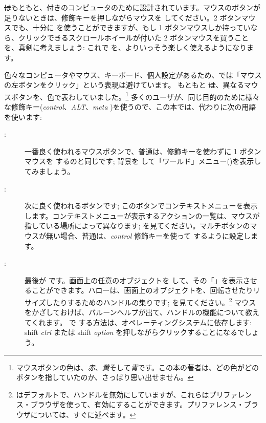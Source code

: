 \documentclass[a4paper,10pt,twoside]{book}
\begin{document}
\st はもともと、付きのコンピュータのために設計されています。マウスのボタンが足りないときは、修飾キーを押しながらマウスを \click してください。2 ボタンマウスでも、十分に \pharo を使うことができますが、もし 1 ボタンマウスしか持っていなら、クリックできるスクロールホイールが付いた 2 ボタンマウスを買うことを、真剣に考えましょう: これで \pharo を、よりいっそう楽しく使えるようになります。

色々なコンピュータやマウス、キーボード、個人設定があるため、\pharo では「マウスの左ボタンをクリック」という表現は避けています。
もともと \st は、異なるマウスボタンを、色で表わしていました。\footnote{マウスボタンの色は、\emph{赤}、\emph{黄}そして\emph{青}です。この本の著者は、どの色がどのボタンを指していたのか、さっぱり思い出せません。}
多くのユーザが、同じ目的のために様々な修飾キー(\emph{control}、\emph{ALT}、\emph{meta} \etc)を使うので、この本では、代わりに次の用語を使います:
\begin{description}
\item [\click:] 一番良く使われるマウスボタンで、普通は、修飾キーを使わずに 1 ボタンマウスを \click するのと同じです; 背景を \click して「ワールド」メニュー()を表示してみましょう。
\item [\actclick:] 次に良く使われるボタンです; このボタンでコンテキストメニューを表示します。コンテキストメニューが表示するアクションの一覧は、マウスが指している場所によって異なります; を見てください。マルチボタンのマウスが無い場合、普通は、\emph{control} 修飾キーを使って \actclick するように設定します。
\item [\metaclick:] 最後が \metaclick です。画面上の任意のオブジェクトを \metaclick して、その「」を表示させることができます。ハローは、画面上のオブジェクトを、回転させたりリサイズしたりするためのハンドルの集りです;  を見てください。\footnote{\pharo はデフォルトで、ハンドルを無効にしていますが、これらはプリファレンス・ブラウザを使って、有効にすることができます。プリファレンス・ブラウザについては、すぐに述べます。}
マウスをかざしておけば、バルーンヘルプが出て、ハンドルの機能について教えてくれます。
\pharo で \metaclick する方法は、オペレーティングシステムに依存します:
{\sc shift} \emph{ctrl} または {\sc shift} \emph{option} を押しながらクリックすることになるでしょう。
\end{description}
\end{document}
